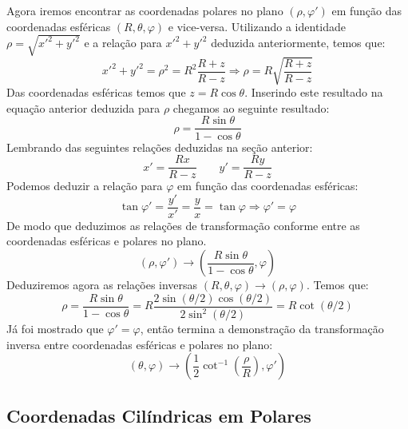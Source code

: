 Agora iremos encontrar as coordenadas polares no 
plano $(\rho,\varphi')$ em função das coordenadas 
esféricas $(R,\theta,\varphi)$ e vice-versa. 
Utilizando a identidade $\rho = \sqrt{{x'}^2 + 
{y'}^2}$ e a relação para ${x'}^2 + {y'}^2$ deduzida 
anteriormente, temos que:
%
\[
{x'}^2 + {y'}^2 = \rho^2 = R^2
\frac{R + z}{R - z} \Rightarrow 
\rho = R\sqrt{\frac{R + z}{R - z}}
\]
%
Das coordenadas esféricas temos que $z = R\cos\theta$. 
Inserindo este resultado na equação anterior deduzida 
para $\rho$ chegamos ao seguinte resultado:
%
\[ 
\rho = \frac{R\sin\theta}{1 - \cos\theta}
\]
%
Lembrando das seguintes relações deduzidas na seção 
anterior:
%
\[ 
x' = \frac{Rx}{R - z} \qquad y' = \frac{Ry}{R - z}
\]
%
Podemos deduzir a relação para $\varphi$ em função das 
coordenadas esféricas:
%
\[
\tan\varphi' = \frac{y'}{x'} = \frac{y}{x} = 
\tan\varphi \Rightarrow \varphi' =
\varphi
\]
%
De modo que deduzimos as relações de transformação 
conforme entre as coordenadas esféricas e polares 
no plano.
%
\[
\left(\rho,\varphi'\right) 
\to \left(\frac{R\sin\theta}{1 - \cos\theta}, 
\varphi\right)
\]
%
Deduziremos agora as relações inversas $(R,\theta, 
\varphi)\to(\rho,\varphi)$. Temos que:
%
\[
\rho = \frac{R\sin\theta}{1 - \cos\theta} =
R\frac{2\sin(\theta/2)\cos(\theta/2)}
{2\sin^2(\theta/2)} = R\cot(\theta/2)
\]
%
Já foi mostrado que $\varphi' = \varphi$, então 
termina a demonstração da transformação inversa 
entre coordenadas esféricas e polares no plano:
%
\[
(\theta,\varphi) \to \left(\frac{1}{2} 
\cot^{-1}\left(\frac{\rho}{R}\right),\varphi'\right)
\]



\subsection{Coordenadas Cilíndricas em Polares}

